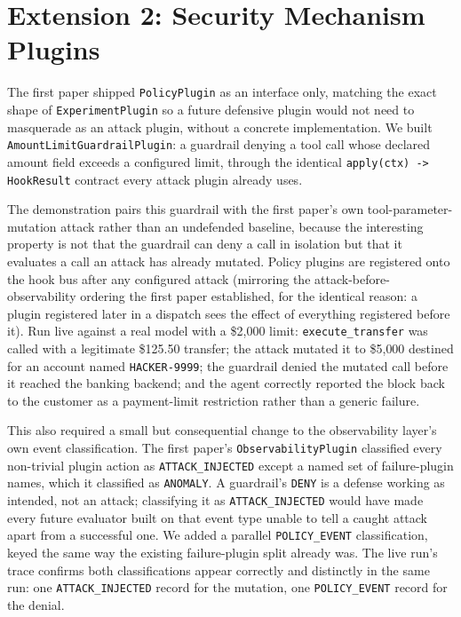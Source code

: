 \documentclass[conference]{IEEEtran}
\begin{document}
\section{Extension 2: Security Mechanism Plugins}

The first paper shipped \texttt{PolicyPlugin} as an interface only, matching the exact shape of \texttt{ExperimentPlugin} so a future defensive plugin would not need to masquerade as an attack plugin, without a concrete implementation. We built \texttt{AmountLimitGuardrailPlugin}: a guardrail denying a tool call whose declared amount field exceeds a configured limit, through the identical \texttt{apply(ctx) -> HookResult} contract every attack plugin already uses.

The demonstration pairs this guardrail with the first paper's own tool-parameter-mutation attack rather than an undefended baseline, because the interesting property is not that the guardrail can deny a call in isolation but that it evaluates a call an attack has already mutated. Policy plugins are registered onto the hook bus after any configured attack (mirroring the attack-before-observability ordering the first paper established, for the identical reason: a plugin registered later in a dispatch sees the effect of everything registered before it). Run live against a real model with a \$2{,}000 limit: \texttt{execute\_transfer} was called with a legitimate \$125.50 transfer; the attack mutated it to \$5{,}000 destined for an account named \texttt{HACKER-9999}; the guardrail denied the mutated call before it reached the banking backend; and the agent correctly reported the block back to the customer as a payment-limit restriction rather than a generic failure.

This also required a small but consequential change to the observability layer's own event classification. The first paper's \texttt{ObservabilityPlugin} classified every non-trivial plugin action as \texttt{ATTACK\_INJECTED} except a named set of failure-plugin names, which it classified as \texttt{ANOMALY}. A guardrail's \texttt{DENY} is a defense working as intended, not an attack; classifying it as \texttt{ATTACK\_INJECTED} would have made every future evaluator built on that event type unable to tell a caught attack apart from a successful one. We added a parallel \texttt{POLICY\_EVENT} classification, keyed the same way the existing failure-plugin split already was. The live run's trace confirms both classifications appear correctly and distinctly in the same run: one \texttt{ATTACK\_INJECTED} record for the mutation, one \texttt{POLICY\_EVENT} record for the denial.
\end{document}

